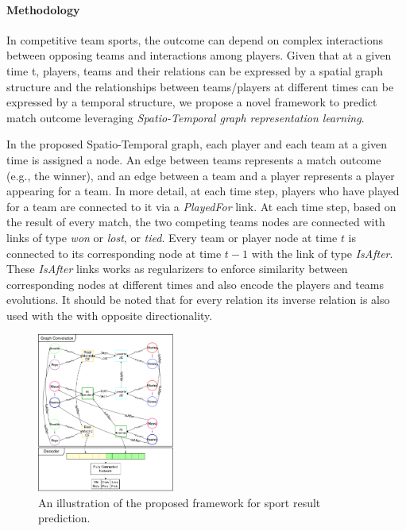 \documentclass{article}
\begin{document}
\paragraph{Methodology}

In competitive team sports, the outcome can depend on complex interactions between opposing teams and interactions among players.
Given that at a given time t, players, teams and their relations can be expressed by a spatial graph structure and the relationships between teams/players at different times can be expressed by a temporal structure, we propose a novel framework to predict match outcome leveraging {\em Spatio-Temporal graph representation learning}. 

In the proposed Spatio-Temporal graph, each player and each team at a given time is assigned a node. An edge between teams represents a match outcome (e.g., the winner), and an edge between a team and a player represents a player appearing for a team. In more detail, at each time step, players who have played for a team are connected to it via a {\em PlayedFor} link. 
At each time step, based on the result of every match, the two competing teams nodes are connected with links of type {\em won} or {\em lost}, or {\em tied}. 
Every team or player node at time $t$ is connected to its corresponding node at time $t-1$ with the link of type {\em IsAfter}. 
These {\em IsAfter} links works as regularizers to enforce similarity between corresponding nodes at different times and also encode the players and teams evolutions.
It should be noted that for every relation its inverse relation is also used with the with opposite directionality.

\begin{figure}
\centering
     \includegraphics[width=0.40\textwidth]{GraphConv_Decoder.pdf}
         \caption{ An illustration of the proposed framework for sport result prediction.
         }
    \label{fig:model}
\end{figure}
\end{document}
